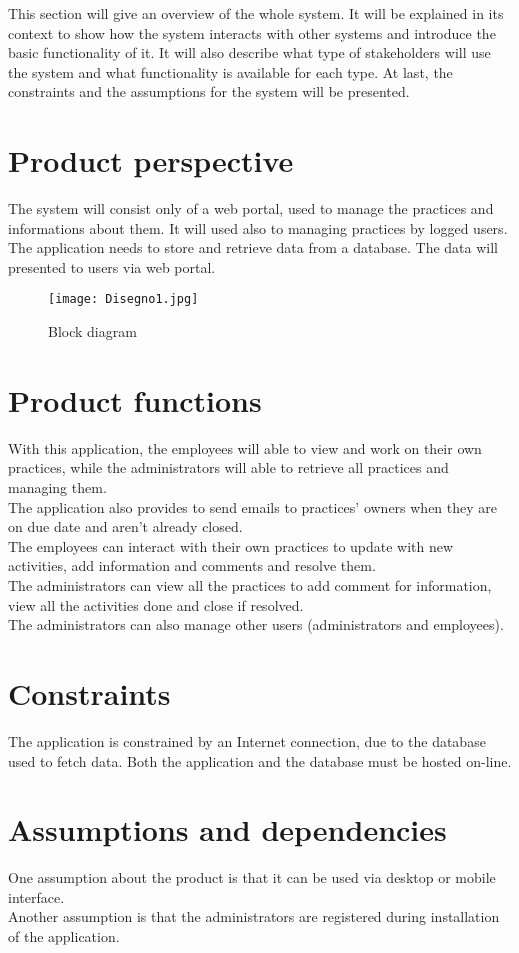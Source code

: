 \documentclass[../main.tex]{subfiles}
\begin{document}
	This section will give an overview of the whole system. It will be explained in its context to show how the system interacts with other systems and introduce the basic functionality of it. It will also describe what type of stakeholders will use the system and what functionality  is available for each type. At last, the constraints and the assumptions for the system will be presented.
	\section{Product perspective}
		The system will consist only of a web portal, used to manage the practices and informations about them. It will used also to managing practices by logged users.\\
		The application needs to store and retrieve data from a database. The data will presented to users via web portal.
		\begin{figure}[h]
			\centering
			\texttt{[image: Disegno1.jpg]}
			\caption{Block diagram}
		\end{figure}
	\section{Product functions}
		With this application, the employees will able to view and work on their own practices, while the administrators will able to retrieve all practices and managing them.\\
		The application also provides to send emails to practices' owners when they are on due date and aren't already closed.\\
		The employees can interact with their own practices to update with new activities, add information and comments and resolve them.\\
		The administrators can view all the practices to add comment for information, view all the activities done and close if resolved.\\
		The administrators can also manage other users (administrators and employees).
	\section{Constraints}
		The application is constrained by an Internet connection, due to the database used to fetch data. Both the application and the database must be hosted on-line. 
	\section{Assumptions and dependencies}
		One assumption about the product is that it can be used via desktop or mobile interface.\\
		Another assumption is that the administrators are registered during installation of the application.
\end{document}
